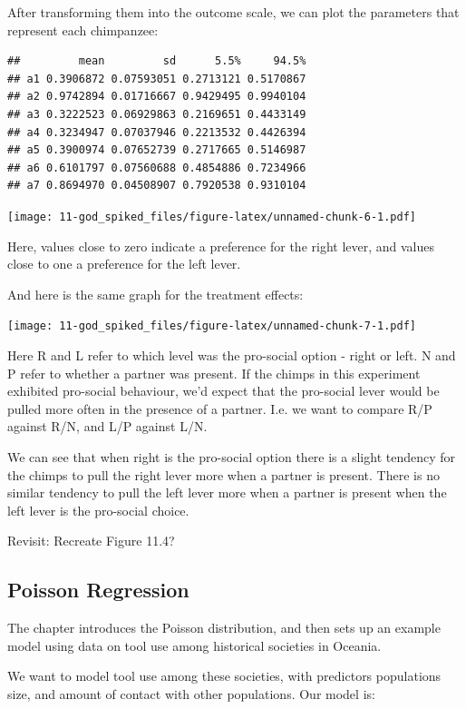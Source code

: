 \documentclass[
]{book}
\begin{document}
After transforming them into the outcome scale, we can plot the parameters that represent each chimpanzee:

\begin{verbatim}
##         mean         sd      5.5%     94.5%
## a1 0.3906872 0.07593051 0.2713121 0.5170867
## a2 0.9742894 0.01716667 0.9429495 0.9940104
## a3 0.3222523 0.06929863 0.2169651 0.4433149
## a4 0.3234947 0.07037946 0.2213532 0.4426394
## a5 0.3900974 0.07652739 0.2717665 0.5146987
## a6 0.6101797 0.07560688 0.4854886 0.7234966
## a7 0.8694970 0.04508907 0.7920538 0.9310104
\end{verbatim}

\texttt{[image: 11-god\_spiked\_files/figure-latex/unnamed-chunk-6-1.pdf]}

Here, values close to zero indicate a preference for the right lever, and values close to one a preference for the left lever.

And here is the same graph for the treatment effects:

\texttt{[image: 11-god\_spiked\_files/figure-latex/unnamed-chunk-7-1.pdf]}

Here R and L refer to which level was the pro-social option - right or left. N and P refer to whether a partner was present. If the chimps in this experiment exhibited pro-social behaviour, we'd expect that the pro-social lever would be pulled more often in the presence of a partner. I.e. we want to compare R/P against R/N, and L/P against L/N.

We can see that when right is the pro-social option there is a slight tendency for the chimps to pull the right lever more when a partner is present. There is no similar tendency to pull the left lever more when a partner is present when the left lever is the pro-social choice.

Revisit: Recreate Figure 11.4?

\hypertarget{poisson-regression}{%
\subsection{Poisson Regression}\label{poisson-regression}}

The chapter introduces the Poisson distribution, and then sets up an example model using data on tool use among historical societies in Oceania.

We want to model tool use among these societies, with predictors populations size, and amount of contact with other populations. Our model is:
\end{document}
